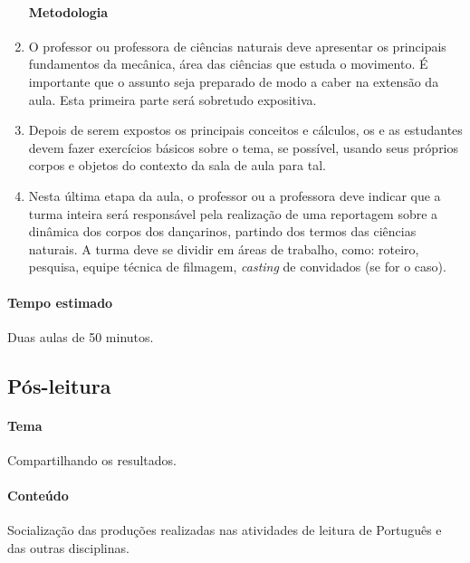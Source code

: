 \documentclass[12pt]{extarticle}
\begin{document}
\begin{enumerate}
\paragraph{Metodologia}

  \item
  O professor ou professora de ciências naturais deve apresentar os 
  principais fundamentos da mecânica, área das ciências que estuda
  o movimento. É importante que o assunto seja preparado de modo
  a caber na extensão da aula. Esta primeira parte será sobretudo expositiva.

  \item
  Depois de serem expostos os principais conceitos e cálculos,
  os e as estudantes devem fazer exercícios básicos sobre o tema, 
  se possível, usando seus próprios corpos e objetos do contexto
  da sala de aula para tal. 

  \item
  Nesta última etapa da aula, o professor ou a professora deve indicar que a turma inteira
  será responsável pela realização de uma reportagem sobre a dinâmica dos 
  corpos dos dançarinos, partindo dos termos das ciências naturais. A turma deve
  se dividir em áreas de trabalho, como: roteiro, pesquisa, equipe técnica de
  filmagem, \textit{casting} de convidados (se for o caso).
\end{enumerate}

\paragraph{Tempo estimado} Duas aulas de 50 minutos.



\subsection{Pós-leitura}

\paragraph{Tema} Compartilhando os resultados.

\paragraph{Conteúdo} Socialização das produções realizadas nas atividades de leitura de Português e das outras disciplinas.
\end{document}
